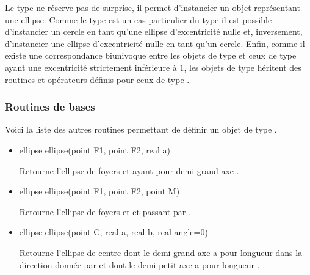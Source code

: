 \documentclass[pdftex]{article}
\begin{document}
Le type  ne réserve pas de surprise, il permet
d'instancier un objet représentant une ellipse. Comme le type 
est un cas particulier du type  il est possible
d'instancier un cercle en tant qu'une ellipse d'excentricité nulle et,
inversement, d'instancier une ellipse d'excentricité nulle en tant
qu'un cercle. Enfin, comme il existe une correspondance biunivoque
entre les objets de type  et ceux de type 
ayant une excentricité strictement inférieure à $1$, les objets de
type  héritent des routines et opérateurs définis pour
ceux de type .

\subsubsection{Routines de bases}
Voici la liste des autres routines permettant de définir un objet de type
.
\begin{itemize}
\item {}
  \begin{Vcolor}
    ellipse ellipse(point F1, point F2, real a)
  \end{Vcolor}
  Retourne l'ellipse de foyers  et  ayant pour
  demi grand axe .
\item {}
  \begin{Vcolor}
    ellipse ellipse(point F1, point F2, point M)
  \end{Vcolor}
  Retourne l'ellipse de foyers  et  et passant par .
\item {}
  \begin{Vcolor}
    ellipse ellipse(point C, real a, real b, real angle=0)
  \end{Vcolor}
  Retourne l'ellipse de centre  dont le demi grand axe
  a pour longueur  dans la direction donnée par  et dont
  le demi petit axe a pour longueur .
\end{itemize}
\end{document}

